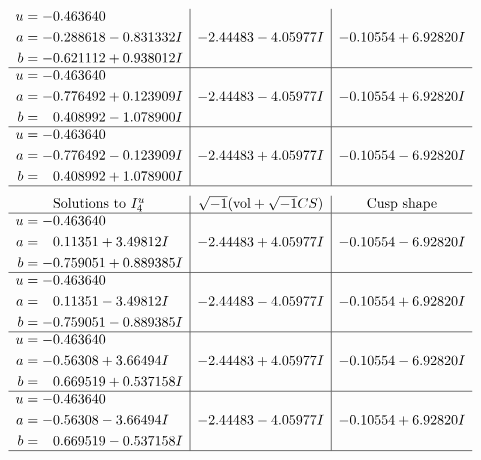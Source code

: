 \documentclass[1p]{elsarticle_modified}
\theoremstyle{definition}
\newcommand{\I}{\sqrt{-1}}
\begin{document}
$$\begin{array}{c|c|c}
\begin{aligned}
u &= -0.463640\phantom{ +0.000000I} \\
a &= -0.288618 - 0.831332 I \\
b &= -0.621112 + 0.938012 I\end{aligned}
 & -2.44483 - 4.05977 I & -0.10554 + 6.92820 I \\ \hline\begin{aligned}
u &= -0.463640\phantom{ +0.000000I} \\
a &= -0.776492 + 0.123909 I \\
b &= \phantom{-}0.408992 - 1.078900 I\end{aligned}
 & -2.44483 - 4.05977 I & -0.10554 + 6.92820 I \\ \hline\begin{aligned}
u &= -0.463640\phantom{ +0.000000I} \\
a &= -0.776492 - 0.123909 I \\
b &= \phantom{-}0.408992 + 1.078900 I\end{aligned}
 & -2.44483 + 4.05977 I & -0.10554 - 6.92820 I\\
 \hline 
 \end{array}$$\newpage$$\begin{array}{c|c|c}  
\text{Solutions to }I^u_{4}& \I (\text{vol} + \sqrt{-1}CS) & \text{Cusp shape}\\
 \hline 
\begin{aligned}
u &= -0.463640\phantom{ +0.000000I} \\
a &= \phantom{-}0.11351 + 3.49812 I \\
b &= -0.759051 + 0.889385 I\end{aligned}
 & -2.44483 + 4.05977 I & -0.10554 - 6.92820 I \\ \hline\begin{aligned}
u &= -0.463640\phantom{ +0.000000I} \\
a &= \phantom{-}0.11351 - 3.49812 I \\
b &= -0.759051 - 0.889385 I\end{aligned}
 & -2.44483 - 4.05977 I & -0.10554 + 6.92820 I \\ \hline\begin{aligned}
u &= -0.463640\phantom{ +0.000000I} \\
a &= -0.56308 + 3.66494 I \\
b &= \phantom{-}0.669519 + 0.537158 I\end{aligned}
 & -2.44483 + 4.05977 I & -0.10554 - 6.92820 I \\ \hline\begin{aligned}
u &= -0.463640\phantom{ +0.000000I} \\
a &= -0.56308 - 3.66494 I \\
b &= \phantom{-}0.669519 - 0.537158 I\end{aligned}
 & -2.44483 - 4.05977 I & -0.10554 + 6.92820 I\\
 \hline 
 \end{array}$$\newpage\newpage\renewcommand{\arraystretch}{1}
\end{document}
